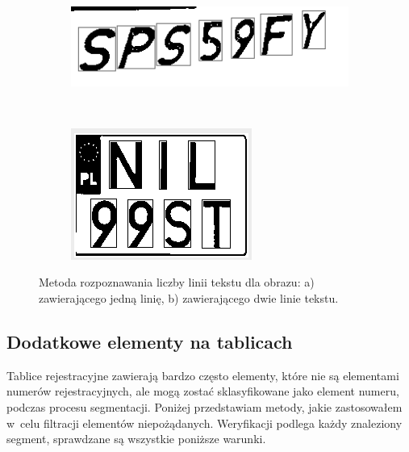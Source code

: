 \begin{figure}
  \centering
  \begin{subfigure}[b]{0.45\textwidth}
    \includegraphics[width=\textwidth]{img/apriori-liczba-linii-jeden}
    \label{fig:apriori_liczba_linii_jeden}
    \caption{}
  \end{subfigure}
  ~
  \begin{subfigure}[b]{0.45\textwidth}
    \includegraphics[width=\textwidth]{img/apriori-liczba-linii-dwa}
    \label{fig:apriori_liczba_linii_dwa}
    \caption{}
  \end{subfigure}
  \caption{Metoda rozpoznawania liczby linii tekstu dla obrazu: a) zawierającego jedną linię, b) zawierającego dwie linie tekstu.}
  \label{fig:apriori_liczba_linii}
\end{figure}

\subsection{Dodatkowe elementy na tablicach}\label{ssec:additional_elements}
Tablice rejestracyjne zawierają bardzo często elementy, które nie są elementami numerów rejestracyjnych, ale mogą zostać sklasyfikowane jako element numeru, podczas procesu segmentacji. Poniżej przedstawiam metody, jakie zastosowałem w~celu filtracji elementów niepożądanych. Weryfikacji podlega każdy znaleziony segment, sprawdzane są wszystkie poniższe warunki.
